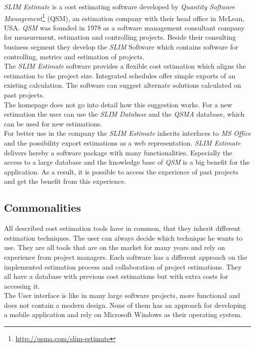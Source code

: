 \textit{SLIM Estimate} is a cost estimating software developed by \textit{Quantity Software Management}\footnote{\url{http://qsma.com/slim-estimate}} (QSM), an estimation company with their head office in McLean, USA. \textit{QSM} was founded in 1978 as a software management consultant company for measurement, estimation and controlling projects. Beside their consulting business segment they develop the \textit{SLIM} Software which contains software for controlling, metrics and estimation of projects.
\\
The \textit{SLIM Estimate} software provides a flexible cost estimation which aligns the estimation to the project size. Integrated schedules offer simple exports of an existing calculation. The software can suggest alternate solutions calculated on past projects.
\\
The homepage does not go into detail how this suggestion works. For a new estimation the user can use the \textit{SLIM Database} and the \textit{QSMA} database, which can be used for new estimations.
\\
For better use in the company the \textit{SLIM Estimate} inherits interfaces to \textit{MS Office} and the possibility export estimations as a web representation. \textit{SLIM Estimate} delivers hereby a software package with many functionalities. Especially the access to a large database and the knowledge base of \textit{QSM} is a big benefit for the application. As a result, it is possible to access the experience of past projects and get the benefit from this experience.


\subsection{Commonalities}

All described cost estimation tools have in common, that they inherit different estimation techniques. The user can always decide which technique he wants to use. They are all tools that are on the market for many years and rely on experience from project managers. Each software has a different approach on the implemented estimation process and collaboration of project estimations. They all have a database with previous cost estimations but with extra costs for accessing it.\\
The User interface is like in many large software projects, more functional and does not contain a modern design. None of them has an approach for developing a mobile application and rely on Microsoft Windows as their operating system.

